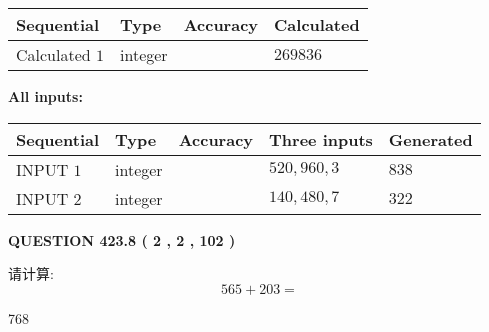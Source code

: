 \documentclass{ctexart}
\begin{document}
   
   
   
\noindent{}
   
   
  
  
\noindent\begin{tabular}{|l|l|l|l|}
\hline
 Sequential & Type & Accuracy & Calculated \\ 
\hline
 
 
  Calculated $  1 $ & integer &  & 
  $ 269836 $ 
 \\  \hline  
 \end{tabular}
   
   
   
   
\noindent\vspace{0.1in}\hspace{-0.08in} {\textbf{\Large{All inputs: }}}
   
   
  
  
\noindent\begin{tabular}{|l|l|l|l|l|}
\hline
 Sequential & Type & Accuracy & Three inputs & Generated \\ 
\hline
 
 
  INPUT $  1 $ & integer &  & $
 520
 , 
 960
 , 
 3
 $ & $ 838 $ 
 \\  \hline  
 
 
  INPUT $  2 $ & integer &  & $
 140
 , 
 480
 , 
 7
 $ & $ 322 $ 
 \\  \hline  
 \end{tabular}
   
   
  
\vspace{0.2in}
  
{\textbf{\Large{QUESTION
423.8 
 ( 2 , 2 , 102 )
}}}
  
  
 
请计算:
\begin{equation}
565 +  %
203 = \nonumber
\end{equation}
 
 
 
\noindent{}
 
 

768
 
 
\noindent{}
 
 

 
 
 
\noindent{}
 
\end{document}
